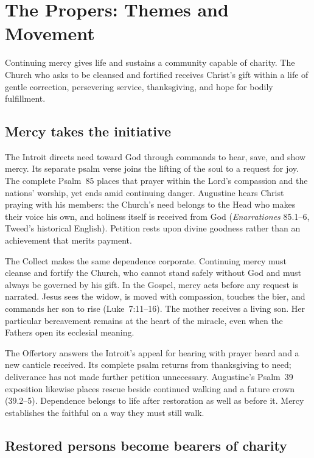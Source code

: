 \section*{The Propers: Themes and Movement}
\label{triptych:brief-synthesis:start}
\begingroup
\setlength{\parskip}{0.32em}

Continuing mercy gives life and sustains a community capable of charity.
The Church who asks to be cleansed and fortified receives Christ's gift
within a life of gentle correction, persevering service, thanksgiving, and
hope for bodily fulfillment.

\subsection*{Mercy takes the initiative\enspace{}}

The Introit directs need toward God through commands to hear, save, and show
mercy. Its separate psalm verse joins the lifting of the soul to a request
for joy. The complete Psalm~85 places that prayer within the Lord's
compassion and the nations' worship, yet ends amid continuing danger.
Augustine hears Christ praying with his members: the Church's need belongs
to the Head who makes their voice his own, and holiness itself is received
from God (\emph{Enarrationes} 85.1--6, Tweed's historical English). Petition
rests upon divine goodness rather than an achievement that merits payment.

The Collect makes the same dependence corporate. Continuing mercy must
cleanse and fortify the Church, who cannot stand safely without God and must
always be governed by his gift. In the Gospel, mercy acts before any request
is narrated. Jesus sees the widow, is moved with compassion, touches the
bier, and commands her son to rise (Luke~7:11--16). The mother receives a
living son. Her particular bereavement remains at the heart of the miracle,
even when the Fathers open its ecclesial meaning.

The Offertory answers the Introit's appeal for hearing with prayer heard and
a new canticle received. Its complete psalm returns from thanksgiving to
need; deliverance has not made further petition unnecessary. Augustine's
Psalm~39 exposition likewise places rescue beside continued walking and a
future crown (39.2--5). Dependence belongs to life after restoration as well
as before it. Mercy establishes the faithful on a way they must still walk.

\subsection*{Restored persons become bearers of charity\enspace{}}

